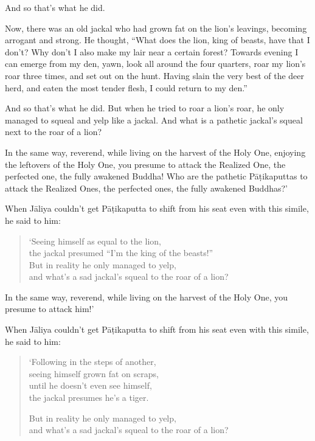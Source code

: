 \documentclass[12pt,openany]{book}%
\begin{document}
And so that’s what he did. 

Now, there was an old jackal who had grown fat on the lion’s leavings, becoming arrogant and strong. He thought, “What does the lion, king of beasts, have that I don’t? Why don’t I also make my lair near a certain forest? Towards evening I can emerge from my den, yawn, look all around the four quarters, roar my lion’s roar three times, and set out on the hunt. Having slain the very best of the deer herd, and eaten the most tender flesh, I could return to my den.” 

And so that’s what he did. But when he tried to roar a lion’s roar, he only managed to squeal and yelp like a jackal. And what is a pathetic jackal’s squeal next to the roar of a lion? 

In the same way, reverend, while living on the harvest of the Holy One, enjoying the leftovers of the Holy One, you presume to attack the Realized One, the perfected one, the fully awakened Buddha! Who are the pathetic \textsanskrit{Pāṭikaputtas} to attack the Realized Ones, the perfected ones, the fully awakened Buddhas?’ 

When \textsanskrit{Jāliya} couldn’t get \textsanskrit{Pāṭikaputta} to shift from his seat even with this simile, he said to him: 

\begin{verse}%
‘Seeing himself as equal to the lion, \\
the jackal presumed “I’m the king of the beasts!” \\
But in reality he only managed to yelp, \\
and what’s a sad jackal’s squeal to the roar of a lion? 

%
\end{verse}

In the same way, reverend, while living on the harvest of the Holy One, you presume to attack him!’ 

When \textsanskrit{Jāliya} couldn’t get \textsanskrit{Pāṭikaputta} to shift from his seat even with this simile, he said to him: 

\begin{verse}%
‘Following in the steps of another, \\
seeing himself grown fat on scraps, \\
until he doesn’t even see himself, \\
the jackal presumes he’s a tiger. 

But in reality he only managed to yelp, \\
and what’s a sad jackal’s squeal to the roar of a lion? 

%
\end{verse}
\end{document}
